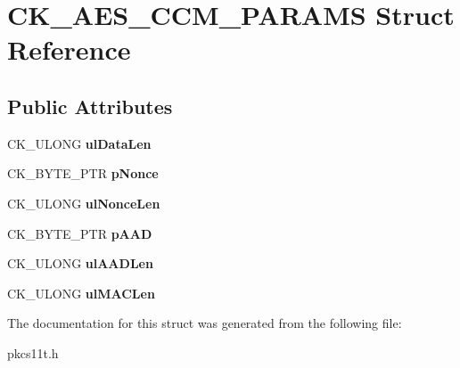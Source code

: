 \hypertarget{struct_c_k___a_e_s___c_c_m___p_a_r_a_m_s}{}\section{C\+K\+\_\+\+A\+E\+S\+\_\+\+C\+C\+M\+\_\+\+P\+A\+R\+A\+MS Struct Reference}
\label{struct_c_k___a_e_s___c_c_m___p_a_r_a_m_s}
\subsection*{Public Attributes}
\begin{DoxyCompactItemize}
\item 
\mbox{\label{struct_c_k___a_e_s___c_c_m___p_a_r_a_m_s_a854e99af78928ab9f7b70531ce6b96dc}} 
C\+K\+\_\+\+U\+L\+O\+NG {\bfseries ul\+Data\+Len}
\item 
\mbox{\label{struct_c_k___a_e_s___c_c_m___p_a_r_a_m_s_a42fe17b551f16efdd4d79f7fb41b00e3}} 
C\+K\+\_\+\+B\+Y\+T\+E\+\_\+\+P\+TR {\bfseries p\+Nonce}
\item 
\mbox{\label{struct_c_k___a_e_s___c_c_m___p_a_r_a_m_s_ad1878e65f15a3a3c0377f18e715ccbfc}} 
C\+K\+\_\+\+U\+L\+O\+NG {\bfseries ul\+Nonce\+Len}
\item 
\mbox{\label{struct_c_k___a_e_s___c_c_m___p_a_r_a_m_s_a881dd36333a5b20f4cff8cf0c3d3e4e2}} 
C\+K\+\_\+\+B\+Y\+T\+E\+\_\+\+P\+TR {\bfseries p\+A\+AD}
\item 
\mbox{\label{struct_c_k___a_e_s___c_c_m___p_a_r_a_m_s_a3630d0c883db06e8ba21cf7479b5cfba}} 
C\+K\+\_\+\+U\+L\+O\+NG {\bfseries ul\+A\+A\+D\+Len}
\item 
\mbox{\label{struct_c_k___a_e_s___c_c_m___p_a_r_a_m_s_a7b13c9f4f543a8ff00776f3b56b821f9}} 
C\+K\+\_\+\+U\+L\+O\+NG {\bfseries ul\+M\+A\+C\+Len}
\end{DoxyCompactItemize}


The documentation for this struct was generated from the following file\+:\begin{DoxyCompactItemize}
\item 
pkcs11t.\+h\end{DoxyCompactItemize}
